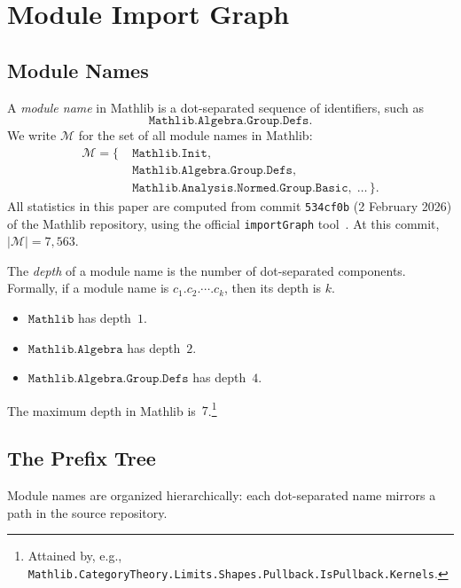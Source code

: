 \section{Module Import Graph}

\subsection{Module Names}

A \emph{module name} in Mathlib is a dot-separated sequence of identifiers, such as
\[
  \texttt{Mathlib.Algebra.Group.Defs}.
\]
We write $\mathcal{M}$ for the set of all module names in Mathlib:
\begin{align*}
  \mathcal{M} = \{\; &\texttt{Mathlib.Init},\\
    &\texttt{Mathlib.Algebra.Group.Defs},\\
    &\texttt{Mathlib.Analysis.Normed.Group.Basic},\; \ldots\,\}.
\end{align*} All statistics in this paper are computed from commit \texttt{534cf0b} (2 February 2026) of the Mathlib repository, using the official \texttt{importGraph} tool~\cite{importgraph}. At this commit, $|\mathcal{M}| = 7{,}563$.

\begin{definition}[Depth]
The \emph{depth} of a module name is the number of dot-separated components. Formally, if a module name is $c_1.c_2.\cdots.c_k$, then its depth is $k$.
\end{definition}

\begin{example}
\leavevmode
\begin{itemize}
  \item $\texttt{Mathlib}$ has depth~$1$.
  \item $\texttt{Mathlib.Algebra}$ has depth~$2$.
  \item $\texttt{Mathlib.Algebra.Group.Defs}$ has depth~$4$.
\end{itemize}
The maximum depth in Mathlib is~$7$.\footnote{Attained by, e.g., \texttt{Mathlib.CategoryTheory.Limits.Shapes.Pullback.IsPullback.Kernels}.}
\end{example}

\subsection{The Prefix Tree}

Module names are organized hierarchically: each dot-separated name mirrors a path in the source repository.

